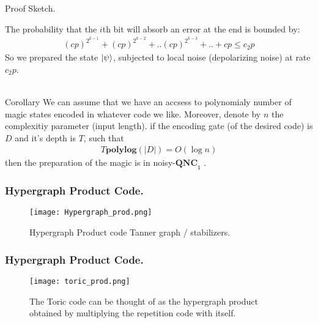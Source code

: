 \documentclass{beamer}
\newcommand*{\QNCon}{ \mathbf{QNC}_{1} }
\newcommand*{\noiseQNCon}{ noisy-$\QNCon$ }
\begin{document}
\begin{frame}{Proof Sketch.}

The probability that the $i$th bit will absorb an error at the end is bounded by:
  \begin{equation*}
    \begin{split}
      \left( cp \right)^{2^{k-1}} + \left( cp \right)^{2^{k-2}} + .. \left( cp \right)^{2^{k-3}} + .. +  cp \le c_{2}p 
    \end{split}
  \end{equation*}
So we prepared the state $\ket{\psi}$, subjected to local noise (depolarizing noise) at rate $c_{2}p$. \\~\

\begin{block}{Corollary}
  We can assume that we have an accsess to polynomialy number of magic states encoded in whatever code we like.
  Moreover, denote by $n$ the complexitiy parameter (input length). if the encoding gate (of the desired code) is $D$ and it's depth is $T$, such that 
  \begin{equation*}
    \begin{split}
      T \mathbf{poly log} \left( |D| \right) = O(\log n)
    \end{split}
  \end{equation*}
  then the preparation of the magic is in\noiseQNCon.
\end{block}

\end{frame}

\begin{frame}
  \frametitle{Hypergraph Product Code.}
\begin{figure}[h]
    \centering
    \texttt{[image: Hypergraph\_prod.png]}
    \caption{ Hypergraph Product code Tanner graph / stabilizers. }
    \label{fig:your-label}
\end{figure}

\end{frame}

\begin{frame}
  \frametitle{Hypergraph Product Code.}

\begin{figure}[h]
    \centering
    \texttt{[image: toric\_prod.png]}
    \caption{The Toric code can be thought of as the hypergraph product obtained by multiplying the repetition code with itself.}
    \label{fig:your-label}
\end{figure}

\end{frame}
\end{document}
